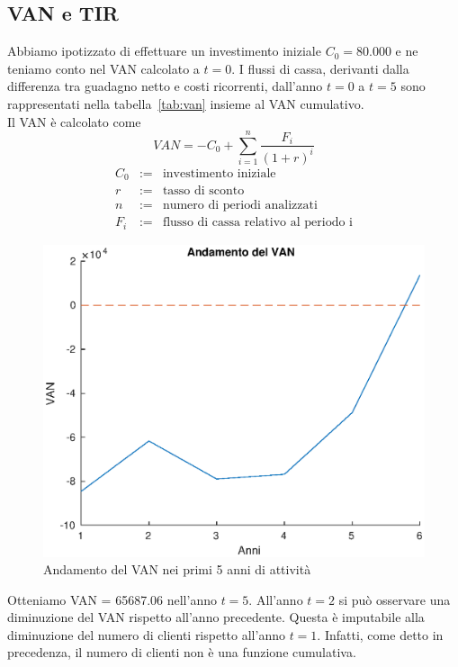 \subsection{VAN e TIR}
Abbiamo ipotizzato di effettuare un investimento iniziale $C_0 = 80.000$ e ne 
teniamo conto nel VAN calcolato a $t=0$.
I flussi di cassa, derivanti dalla differenza tra guadagno netto e costi
ricorrenti, dall’anno $t=0$ a $t=5$ sono rappresentati nella
tabella~\ref{tab:van} insieme al VAN cumulativo.\\
Il VAN è calcolato come
\begin{displaymath}
VAN = - C_0 + \sum_{i=1}^n \frac{F_i}{(1 + r)^i}
\end{displaymath}
\begin{eqnarray*}
C_0 &:=& \mbox{investimento iniziale} \\
r &:=& \mbox{tasso di sconto} \\
n &:=& \mbox{numero di periodi analizzati} \\
F_i &:=& \mbox{flusso di cassa relativo al periodo i}
\end{eqnarray*}

%
\begin{figure}[!h]
\centering
\includegraphics[width=\textwidth]{figures/van}
\caption{Andamento del VAN nei primi 5 anni di attività}
\label{van}
\end{figure}
%
Otteniamo VAN = 65687.06 nell'anno $t=5$. All'anno $t=2$ si può osservare una
diminuzione del VAN rispetto all'anno precedente. Questa è imputabile alla
diminuzione del numero di clienti rispetto all'anno $t=1$. Infatti, come detto
in precedenza, il numero di clienti non è una funzione cumulativa.

